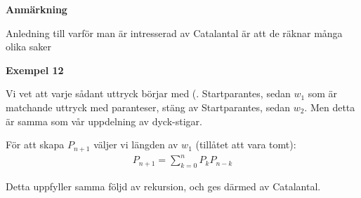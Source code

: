 \par\bigskip
\noindent\textbf{Anmärkning}\par
\noindent Anledning till varför man är intresserad av Catalantal är att de räknar många olika saker
\par\bigskip
\noindent\textbf{Exempel 12}\par
\noindent Vi vet att varje sådant uttryck börjar med (. Startparantes, sedan $w_1$ som är matchande uttryck med paranteser, stäng av Startparantes, sedan $w_2$. Men detta är samma som vår uppdelning av dyck-stigar.\par
\noindent För att skapa $P_{n+1}$ väljer vi längden av $w_1$ (tillåtet att vara tomt):
\begin{equation*}
  \begin{gathered}
    P_{n+1} = \sum_{k=0}^{n}P_kP_{n-k}
  \end{gathered}
\end{equation*}\par
\noindent Detta uppfyller samma följd av rekursion, och ges därmed av Catalantal.  
